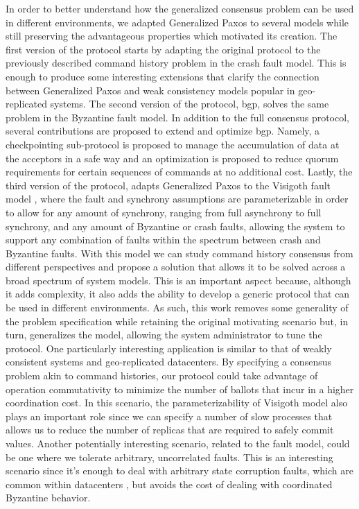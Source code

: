 In order to better understand how the generalized consensus problem can be used in different environments, we adapted Generalized Paxos to several models while still preserving the advantageous properties which motivated its creation. The first version of the protocol starts by adapting the original protocol to the previously described command history problem in the crash fault model. {\color{red} This is enough to produce some interesting extensions that clarify the connection between Generalized Paxos and weak consistency models popular in geo-replicated systems.} The second version of the protocol, \acrfull{bgp}, solves the same problem in the Byzantine fault model. In addition to the full consensus protocol, several contributions are proposed to extend and optimize \acrshort{bgp}. Namely, a checkpointing sub-protocol is proposed to manage the accumulation of data at the acceptors in a safe way and an optimization is proposed to reduce quorum requirements for certain sequences of commands at no additional cost. Lastly, the third version of the protocol, adapts Generalized Paxos to the Visigoth fault model \cite{Porto2015}, where the fault and synchrony assumptions are parameterizable in order to allow for any amount of synchrony, ranging from full asynchrony to full synchrony, and any amount of Byzantine or crash faults, allowing the system to support any combination of faults within the spectrum between crash and Byzantine faults. With this model we can study command history consensus from different perspectives and propose a solution that allows it to be solved across a broad spectrum of system models. This is an important aspect because, although it adds complexity, it also adds the ability to develop a generic protocol that can be used in different environments. As such, this work removes some generality of the problem specification while retaining the original motivating scenario but, in turn, generalizes the model, allowing the system administrator to tune the protocol.  One particularly interesting application is similar to that of weakly consistent systems and geo-replicated datacenters. By specifying a consensus problem akin to command histories, our protocol could take advantage of operation commutativity to minimize the number of ballots that incur in a higher coordination cost. In this scenario, the parameterizability of Visigoth model also plays an important role since we can specify a number of slow processes that allows us to reduce the number of replicas that are required to safely commit values. Another potentially interesting scenario, related to the fault model, could be one where we tolerate arbitrary, uncorrelated faults. This is an interesting scenario since it's enough to deal with arbitrary state corruption faults, which are common within datacenters \cite{AmazonS32}, but avoids the cost of dealing with coordinated Byzantine behavior.\par 



